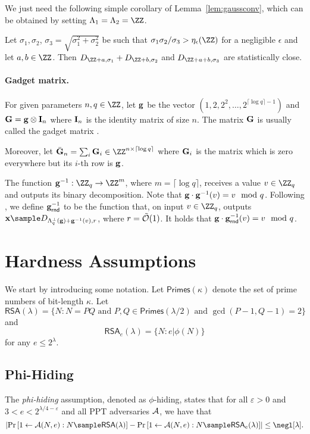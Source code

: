We just need the following simple corollary of Lemma~\ref{lem:gaussconv}, which can be obtained by setting $\Lambda_1 = \Lambda_2 = \ZZ$.

\begin{corollary}\label{cor:gaussconv}
Let $\sigma_1,\sigma_2$, $\sigma_3 = \sqrt{\sigma_1^2 + \sigma_2^2}$ be such that $\sigma_1 \sigma_2 / \sigma_3 > \eta_\epsilon(\ZZ)$ for a negligible $\epsilon$ and let $a,b \in \ZZ$. Then $D_{\ZZ + a,\sigma_1} + D_{\ZZ + b,\sigma_2}$ and $D_{\ZZ + a + b,\sigma_3}$ are statistically close. 
\end{corollary}




\paragraph{Gadget matrix.} For given parameters $n,q\in\ZZ$, let $\mathbf{g}$ be the vector $\left(1,2,2^2,\dots, 2^{\lceil\log q\rceil-1}\right)$ and $\mathbf{G}=\mathbf{g}\otimes \mathbf{I}_n$ where $\mathbf{I}_n$ is the identity matrix of size $n$. The matrix $\mathbf{G}$ is usually called the gadget matrix \cite{EC:MicPei12}.

Moreover, let $\bar \Gn_n=\sum_i \Gn_i\in\ZZ^{n\times \lceil\log q\rceil}$ where $\mathbf{G}_i$ is the matrix which is zero everywhere but its $i$-th row is $\mathbf{g}$.

The function $\gn^{-1}:\ZZ_q\to\ZZ^m$, where $m=\lceil\log q\rceil$, receives a value $v\in\ZZ_q$ and outputs its binary decomposition. Note that $\mathbf{g}\cdot\mathbf{g}^{-1}(v)=v\mod q$. Following \cite{C:BdMW16}, we define $\mathbf{g}^{-1}_\mathsf{rnd}$ to be the function that, on input $v\in\ZZ_q$, outputs $\xn\sample D_{\Lambda^\perp_q(\gn)+\gn^{-1}(v),r}$, where $r=\tilde {\mathcal{O}}(1)$. It holds that $\mathbf{g}\cdot\mathbf{g}^{-1}_\mathsf{rnd}(v)=v\mod q$.



\section{Hardness Assumptions}
\label{sec:hardnessassum}
We start by introducing some notation. Let $\mathsf{Primes}(\kappa)$ denote the set of prime numbers of bit-length $\kappa$. Let $$\mathsf{RSA}(\lambda)=\{N:N=PQ\text{ and } P,Q\in\mathsf{Primes}(\lambda/2)\text{ and } \gcd(P-1,Q-1)=2\}$$ and  $$\mathsf{RSA}_e(\lambda)=\{N:e|\phi(N)\}$$ for any $e\leq 2^\lambda$.
\subsection{Phi-Hiding}
\begin{definition}
The \emph{phi-hiding} assumption, denoted as $\phi$-hiding, states that for all  $\varepsilon>0$ and $3<e<2^{\lambda/4-\varepsilon}$ and all PPT adversaries $\mathcal{A}$, we have that $$\left|\Pr\left[1\leftarrow\Ac(N,e):N\sample \mathsf{RSA}(\lambda)\right]-\Pr\left[1\leftarrow\Ac(N,e):N\sample \mathsf{RSA}_e(\lambda)\right]\right|\leq \negl[\lambda].$$
\end{definition}

